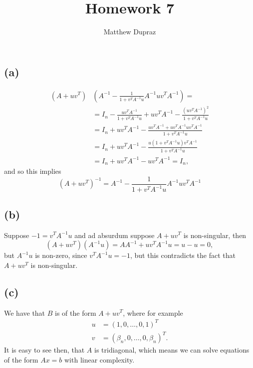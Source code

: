 \documentclass{article}
\title{Homework 7}
\author{Matthew Dupraz}
\begin{document}
\maketitle

\subsection*{(a)}


\begin{align*}
	(A + uv^T)&(A^{-1} - \frac{1}{1 + v^TA^{-1}u}A^{-1}uv^TA^{-1}) = \\
	&= I_n - \frac{uv^TA^{-1}}{1 + v^TA^{-1}u} + uv^TA^{-1}
	- \frac{(uv^TA^{-1})^2}{1+v^TA^{-1}u}\\
	&= I_n + uv^TA^{-1} - \frac{uv^TA^{-1} + uv^TA^{-1}uv^TA^{-1}}
	{1 + v^TA^{-1}u}\\
	&= I_n + uv^TA^{-1} - \frac{u(1 + v^TA^{-1}u)v^TA^{-1}}
	{1 + v^TA^{-1}u}\\
	&= I_n + uv^TA^{-1} - uv^TA^{-1} = I_n,
\end{align*}
and so this implies
\begin{equation*}
	(A + uv^T)^{-1} = A^{-1} - \frac{1}{1 + v^TA^{-1}u}A^{-1}uv^TA^{-1}
\end{equation*}

\subsection*{(b)}

Suppose $-1 = v^TA^{-1}u$ and ad absurdum suppose $A + uv^T$ is non-singular,
then
\begin{equation*}
	(A + uv^T)(A^{-1}u) = AA^{-1} + uv^TA^{-1}u = u - u = 0,
\end{equation*}
but $A^{-1}u$ is non-zero, since $v^TA^{-1}u = -1$, but this contradicts the
fact that $A + uv^T$ is non-singular.

\subsection*{(c)}
We have that $B$ is of the form $A + uv^T$, where for example
\begin{align*}
	u &= (1, 0, \dots, 0, 1)^T\\
	v &= (\beta_n, 0, \dots, 0, \beta_n)^T.
\end{align*}
It is easy to see then, that $A$ is tridiagonal, which means we can solve
equations of the form $Ax = b$ with linear complexity.
\end{document}
